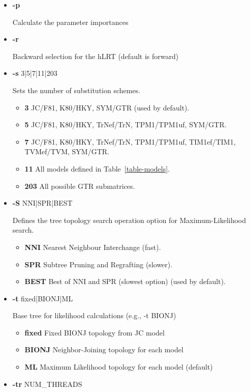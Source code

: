 \documentclass[11pt,twoside,a4paper]{article}
\begin{document}
\begin{itemize}
\item  {\bf -p}

Calculate the parameter importances

\item  {\bf -r}

Backward selection for the hLRT (default is forward)

\item  {\bf -s} 3|5|7|11|203

Sets the number of substitution schemes.
\begin{itemize}
     \item {\bf 3} JC/F81, K80/HKY, SYM/GTR (used by default).
     \item {\bf 5} JC/F81, K80/HKY, TrNef/TrN, TPM1/TPM1uf, SYM/GTR.
     \item {\bf 7} JC/F81, K80/HKY, TrNef/TrN, TPM1/TPM1uf, TIM1ef/TIM1, TVMef/TVM, SYM/GTR.
     \item {\bf 11} All models defined in Table~\ref{table-models}.
     \item {\bf 203} All possible GTR submatrices.
\end{itemize}

\item  {\bf -S} NNI|SPR|BEST

Defines the tree topology search operation option for Maximum-Likelihood search. 
\begin{itemize}
     \item {\bf NNI} Nearest Neighbour Interchange (fast).
     \item {\bf SPR} Subtree Pruning and Regrafting (slower).
     \item {\bf BEST} Best of NNI and SPR (slowest option) (used by default).
\end{itemize}

\item  {\bf -t} fixed|BIONJ|ML

Base tree for likelihood calculations (e.g., -t BIONJ)
\begin{itemize}
     \item {\bf fixed}  Fixed BIONJ topology from JC model
     \item {\bf BIONJ}  Neighbor-Joining topology for each model
     \item {\bf ML}     Maximum Likelihood topology for each model (default)
\end{itemize}

\item  {\bf -tr} NUM\_THREADS


\end{itemize}
\end{document}
